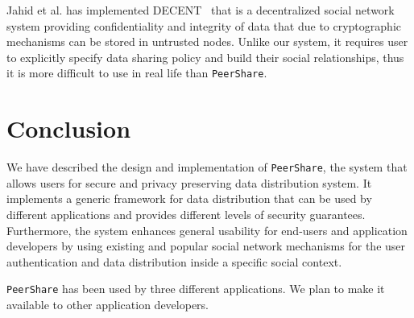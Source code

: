 \documentclass[twocolumn,a4paper,10pt]{article}
\newcommand{\peershare}{\texttt{PeerShare}\xspace}
\begin{document}
Jahid et al. has implemented DECENT~\cite{DBLP:conf/percom/JahidNMBK12} that is a decentralized social network system providing confidentiality and integrity of data that due to cryptographic mechanisms can be stored in untrusted nodes. Unlike our system, it requires user to explicitly specify data sharing policy and build their social relationships, thus it is more difficult to use in real life than \peershare.

\section{Conclusion}
\label{:conclusion}
We have described the design and implementation of \peershare, the system that allows users for secure and privacy preserving data distribution system. It implements a generic framework for data distribution that can be used by different applications and provides different levels of security guarantees. Furthermore, the system enhances general usability for end-users and application developers by using existing and popular social network mechanisms for the user authentication and data distribution inside a specific social context.

\peershare has been used by three different applications. We plan to make it available to other application developers.



\end{document}
